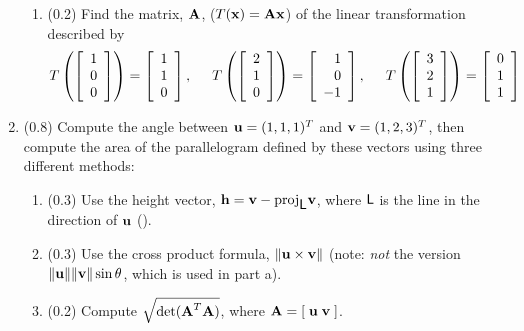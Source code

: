 \documentclass[11pt,titlepage,fleqn]{article}
\begin{document}
\begin{enumerate}
\begin{enumerate}
\item (0.2) Find the matrix, $\mbox{${\bf A}$}$, ($T(\mbox{${\bf x}$}) = \mbox{${\bf A}$}\mbox{${\bf x}$}$) of the linear transformation described by
%
\begin{equation*}
T \left( \left[ \begin{array}{r} 1 \\ 0 \\ 0  \end{array} \right] \right) = \left[ \begin{array}{r} 1 \\ 1 \\ 0 \end{array} \right],
\hspace{0.5cm}
T \left( \left[ \begin{array}{r} 2 \\ 1 \\ 0  \end{array} \right] \right) = \left[ \begin{array}{r} 1 \\ 0 \\ -1 \end{array} \right],
\hspace{0.5cm}
T \left( \left[ \begin{array}{r} 3 \\ 2 \\ 1  \end{array} \right] \right) = \left[ \begin{array}{r} 0 \\ 1 \\ 1 \end{array} \right]
\end{equation*}

\end{enumerate}


\item (0.8) Compute the angle between $\mbox{${\bf u}$} = (1,1,1)^T$ and $\mbox{${\bf v}$} = (1,2,3)^T$, then compute the area of the parallelogram defined by these vectors using three different methods:
%
\begin{enumerate}
\item (0.3) Use the height vector, $\mbox{${\bf h}$} = \mbox{${\bf v}$} - \mathrm{proj}_{\mbox{${\sf L}$}} \mbox{${\bf v}$}$, where $\mbox{${\sf L}$}$ is the line in the direction of $\mbox{${\bf u}$}$ ().
\item (0.3) Use the cross product formula, $\| \mbox{${\bf u}$} \times \mbox{${\bf v}$} \|$ (note: {\em not} the version $\|\mbox{${\bf u}$}\|\|\mbox{${\bf v}$}\|\sin\theta$, which is used in part a).
\item (0.2) Compute $\sqrt{\det(\mbox{${\bf A}$}^T \mbox{${\bf A}$})}$, where $\mbox{${\bf A}$} = [\;\mbox{${\bf u}$} \; \mbox{${\bf v}$}\;]$.
\end{enumerate}


\end{enumerate}
\end{document}
